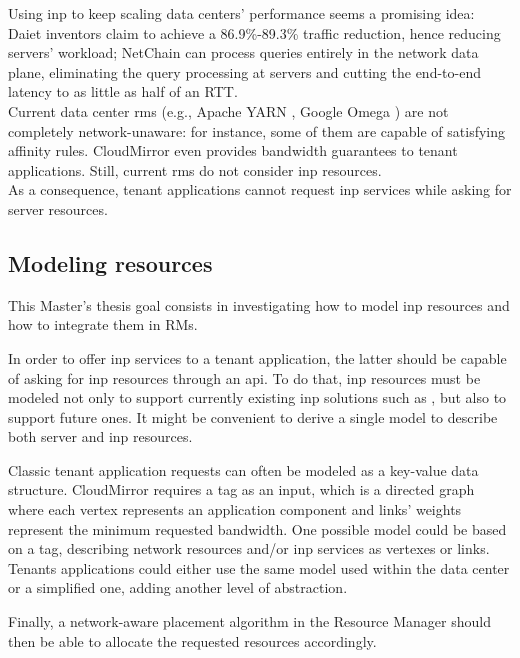 Using \gls{inp} to keep scaling data centers' performance seems a promising idea: Daiet \cite{daiet} inventors claim to achieve a 86.9\%-89.3\% traffic reduction, hence reducing servers' workload; NetChain \cite{netchain} can process queries entirely in the network data plane, eliminating the query processing at servers and cutting the end-to-end latency to as little as half of an RTT.\\
Current data center \glspl{rm} (e.g., Apache YARN \cite{yarn}, Google Omega \cite{omega}) are not completely network-unaware: for instance, some of them are capable of satisfying affinity rules. CloudMirror \cite{cloudmirror} even provides bandwidth guarantees to tenant applications. Still, current \glspl{rm} do not consider \gls{inp} resources.\\
As a consequence, tenant applications cannot request \gls{inp} services while asking for server resources.

\subsection{Modeling \texorpdfstring{}{INP} resources}
This Master's thesis goal consists in investigating how to model \gls{inp} resources and how to integrate them in RMs.\par
In order to offer \gls{inp} services to a tenant application, the latter should be capable of asking for \gls{inp} resources through an \gls{api}. To do that, \gls{inp} resources must be modeled not only to support currently existing \gls{inp} solutions such as \cite{daiet} \cite{netchain} \cite{incbricks} \cite{sharp}, but also to support future ones. It might be convenient to derive a single model to describe both server and \gls{inp} resources.\par
Classic tenant application requests can often be modeled as a key-value data structure. CloudMirror \cite{cloudmirror} requires a \gls{tag} as an input, which is a directed graph where each vertex represents an application component and links' weights represent the minimum requested bandwidth. One possible model could be based on a \gls{tag}, describing network resources and/or \gls{inp} services as vertexes or links. Tenants applications could either use the same model used within the data center or a simplified one, adding another level of abstraction.\par
Finally, a network-aware placement algorithm in the Resource Manager should then be able to allocate the requested resources accordingly.